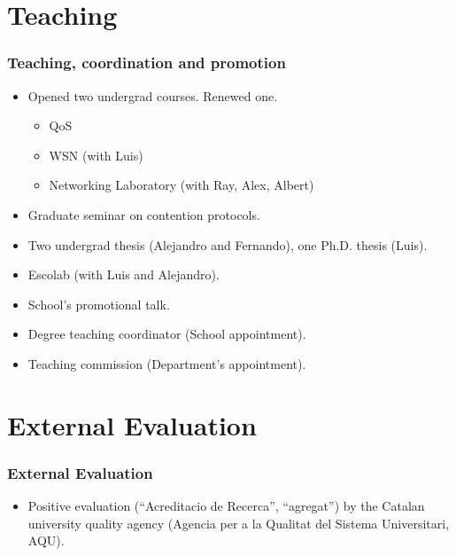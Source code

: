 \documentclass{beamer}
\begin{document}
\section{Teaching}
\begin{frame}
  \frametitle{Teaching, coordination and promotion}
      \begin{block}{}
        \begin{itemize}
          \item Opened two undergrad courses. Renewed one.
          \begin{itemize}
              \item QoS
              \item WSN (with Luis) 
              \item Networking Laboratory (with Ray, Alex, Albert)
          \end{itemize}
          \item Graduate seminar on contention protocols.
          \item Two undergrad thesis (Alejandro and Fernando), one Ph.D. thesis (Luis).
          \item Escolab (with Luis and Alejandro).
          \item School's promotional talk.
          \item Degree teaching coordinator (School appointment).
          \item Teaching commission (Department's appointment).
        \end{itemize}
      \end{block}
\end{frame}


\section{External Evaluation}
\begin{frame}
  \frametitle{External Evaluation}
      \begin{block}{}
        \begin{itemize}
          \item Positive evaluation (``Acreditacio de Recerca'', ``agregat'') by the Catalan university quality agency (Agencia per a la Qualitat del Sistema Universitari, AQU).
        \end{itemize}
      \end{block}
\end{frame}

{
\begin{frame}[plain]
\end{frame}
}
\end{document}
